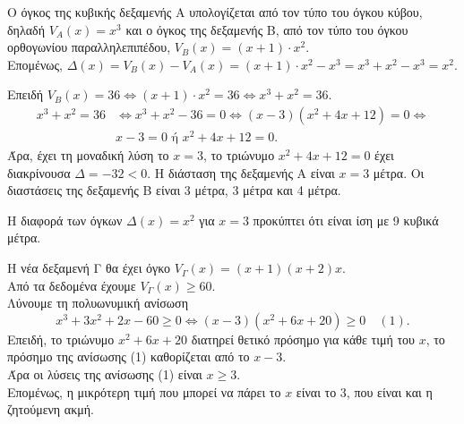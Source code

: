 \begin{alist}
\item Ο όγκος της κυβικής δεξαμενής A υπολογίζεται από τον τύπο του όγκου κύβου, δηλαδή $V_A(x) = x^3$ και ο όγκος της δεξαμενής Β, από τον τύπο του όγκου ορθογωνίου παραλληλεπιπέδου, $V_B(x) = (x + 1) \cdot x^2$. \\
Επομένως, $\Delta(x) = V_B(x) - V_A(x) = (x + 1) \cdot x^2 - x^3 = x^3 + x^2 - x^3 = x^2$.
\item
\begin{rlist}
\item Επειδή $V_B(x) = 36 \Leftrightarrow (x + 1) \cdot x^2 = 36 \Leftrightarrow x^3 + x^2 = 36$.
\begin{align*}
x^3 + x^2 = 36 &\Leftrightarrow x^3 + x^2 - 36 = 0 \Leftrightarrow (x - 3)(x^2 + 4x + 12) = 0 \Leftrightarrow \\
& x - 3 = 0 \text{ ή } x^2 + 4x + 12 = 0.
\end{align*}
Άρα, έχει τη μοναδική λύση το $x=3$, το τριώνυμο $x^2 + 4x + 12 = 0$ έχει διακρίνουσα $\Delta = -32 < 0$. Η διάσταση της δεξαμενής Α είναι $x = 3$ μέτρα. Οι διαστάσεις της δεξαμενής Β είναι 3 μέτρα, 3 μέτρα και 4 μέτρα.
\item Η διαφορά των όγκων $\Delta(x) = x^2$ για $x = 3$ προκύπτει ότι είναι ίση με 9 κυβικά μέτρα.
\end{rlist}
\item Η νέα δεξαμενή Γ θα έχει όγκο $V_{\Gamma}(x) = (x + 1)(x + 2)x$. \\
Από τα δεδομένα έχουμε $V_{\Gamma}(x) \ge 60$. \\
Λύνουμε τη πολυωνυμική ανίσωση
\[x^3 + 3x^2 + 2x - 60 \ge 0 \Leftrightarrow (x - 3)(x^2 + 6x + 20) \ge 0 \quad (1).\]
Επειδή, το τριώνυμο $x^2 + 6x + 20$ διατηρεί θετικό πρόσημο για κάθε τιμή του $x$, το πρόσημο της ανίσωσης (1) καθορίζεται από το $x-3$. \\
Άρα οι λύσεις της ανίσωσης (1) είναι $x \ge 3$. \\
Επομένως, η μικρότερη τιμή που μπορεί να πάρει το $x$ είναι το $3$, που είναι και η ζητούμενη ακμή.
\end{alist}

